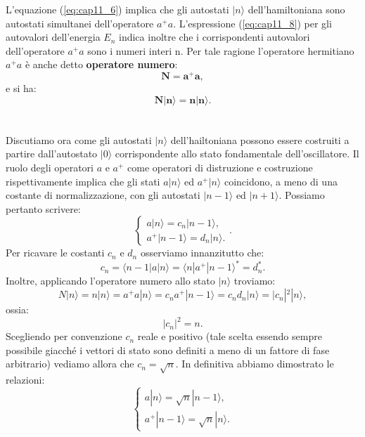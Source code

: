 \documentclass[a4paper,12pt,oneside]{book}
\begin{document}
 L'equazione (\ref{eq:cap11_6}) implica che gli autostati $|n\rangle$ dell'hamiltoniana sono autostati simultanei dell'operatore $a^+a$. L'espressione (\ref{eq:cap11_8}) per gli autovalori dell'energia $E_n$ indica inoltre che i corrispondenti autovalori dell'operatore $a^+a$ sono i numeri interi n. Per tale ragione l'operatore hermitiano $a^+a$ è anche detto \textbf{operatore numero}:
\begin{equation}
\mathbf{N=a^+a},
\end{equation}
e si ha:
\begin{equation}
\mathbf{N|n\rangle=n|n\rangle}.
\end{equation}
\\\\
 Discutiamo ora come gli autostati $|n\rangle$ dell'hailtoniana possono essere costruiti a partire dall'autostato $|0\rangle$ corrispondente allo stato fondamentale dell'oscillatore.
 Il ruolo degli operatori $a$ e $a^+$ come operatori di distruzione e costruzione rispettivamente implica che gli stati $a|n\rangle$ ed $a^+|n\rangle$ coincidono, a meno di una costante di normalizzazione, con gli autostati $|n-1\rangle$ ed $|n+1\rangle$. Possiamo pertanto scrivere:
\begin{equation}
\begin{cases}
a|n\rangle=c_n|n-1\rangle,\\
a^+|n-1\rangle=d_n|n\rangle.
\end{cases}.
\end{equation}
 Per ricavare le costanti $c_n$ e $d_n$ osserviamo innanzitutto che:
\begin{equation}
c_n=\langle n-1|a|n\rangle=\langle n|a^+|n-1\rangle^*=d_n^*.
\end{equation}
 Inoltre, applicando l'operatore numero allo stato $|n\rangle$ troviamo:
\begin{equation}
N|n\rangle=n|n\rangle=a^+a|n\rangle=c_na^+|n-1\rangle=c_nd_n|n\rangle=|c_n|^2|n\rangle,
\end{equation}
ossia:
\begin{equation}
|c_n|^2=n.
\end{equation}
Scegliendo per convenzione $c_n$ reale e positivo (tale scelta essendo sempre possibile giacché i vettori di stato sono definiti a meno di un fattore di fase arbitrario) vediamo allora che $c_n=\sqrt{n}$. In definitiva abbiamo dimostrato le relazioni:
\begin{equation} \label{eq:cap11_9}
\begin{cases}
a|n\rangle= \sqrt{n} |n-1\rangle, \\
a^+|n-1\rangle=\sqrt{n}|n\rangle.
\end{cases}
\end{equation}
\end{document}
